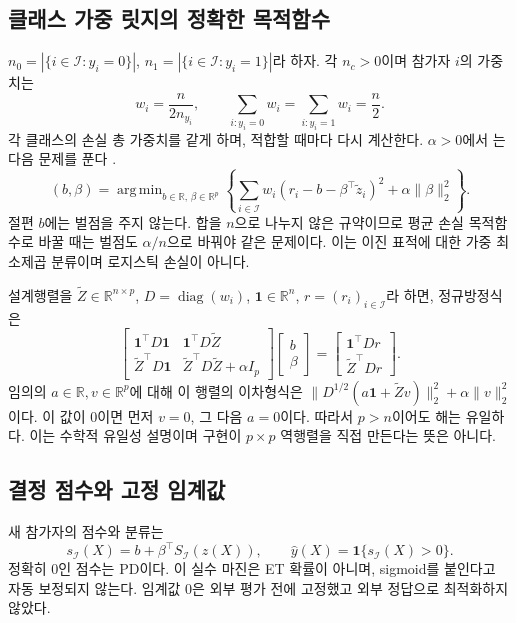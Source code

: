 \documentclass[11pt,a4paper]{article}
\newcommand{\R}{\mathbb R}
\newcommand{\ind}{\mathbf 1}
\newcommand{\code}[1]{\texttt{\detokenize{#1}}}
\DeclareMathOperator*{\argmin}{arg\,min}
\numberwithin{equation}{section}
\begin{document}
\subsection{클래스 가중 릿지의 정확한 목적함수}
$n_0=|\{i\in\mathcal I:y_i=0\}|$,
$n_1=|\{i\in\mathcal I:y_i=1\}|$라 하자.
각 $n_c>0$이며 참가자 $i$의 가중치는
\begin{equation}
 w_i=\frac{n}{2n_{y_i}},\qquad
 \sum_{i:y_i=0}w_i=\sum_{i:y_i=1}w_i=\frac n2.
\end{equation}
각 클래스의 손실 총 가중치를 같게 하며, 적합할 때마다 다시 계산한다.
$\alpha>0$에서 \code{RidgeClassifier}는 다음 문제를 푼다 \cite{ridge}.
\begin{equation}
 (b,\beta)=\argmin_{b\in\R,\,\beta\in\R^p}
 \left\{\sum_{i\in\mathcal I}w_i
 (r_i-b-\beta^\top\widetilde z_i)^2+\alpha\|\beta\|_2^2\right\}.
 \label{eq:ridge}
\end{equation}
절편 $b$에는 벌점을 주지 않는다. 합을 $n$으로 나누지 않은 규약이므로
평균 손실 목적함수로 바꿀 때는 벌점도 $\alpha/n$으로 바꿔야 같은 문제이다.
이는 이진 표적에 대한 가중 최소제곱 분류이며 로지스틱 손실이 아니다.

설계행렬을 $\widetilde Z\in\R^{n\times p}$,
$D=\operatorname{diag}(w_i)$, $\bm 1\in\R^n$, $r=(r_i)_{i\in\mathcal I}$라 하면,
정규방정식은
\begin{equation}
 \begin{bmatrix}
 \bm1^\top D\bm1&\bm1^\top D\widetilde Z\\
 \widetilde Z^\top D\bm1&\widetilde Z^\top D\widetilde Z+\alpha I_p
 \end{bmatrix}
 \begin{bmatrix}b\\\beta\end{bmatrix}
 =\begin{bmatrix}\bm1^\top Dr\\\widetilde Z^\top Dr\end{bmatrix}.
 \label{eq:normal}
\end{equation}
임의의 $a\in\R,v\in\R^p$에 대해 이 행렬의 이차형식은
$\|D^{1/2}(a\bm1+\widetilde Zv)\|_2^2+\alpha\|v\|_2^2$이다.
이 값이 0이면 먼저 $v=0$, 그 다음 $a=0$이다.
따라서 $p>n$이어도 해는 유일하다.
이는 수학적 유일성 설명이며 구현이 $p\times p$ 역행렬을 직접 만든다는 뜻은 아니다.

\subsection{결정 점수와 고정 임계값}
새 참가자의 점수와 분류는
\begin{equation}
 s_{\mathcal I}(X)=b+\beta^\top S_{\mathcal I}(z(X)),\qquad
 \widehat y(X)=\ind\{s_{\mathcal I}(X)>0\}.
\end{equation}
정확히 0인 점수는 PD이다.
이 실수 마진은 ET 확률이 아니며, sigmoid를 붙인다고 자동 보정되지 않는다.
임계값 0은 외부 평가 전에 고정했고 외부 정답으로 최적화하지 않았다.
\end{document}
